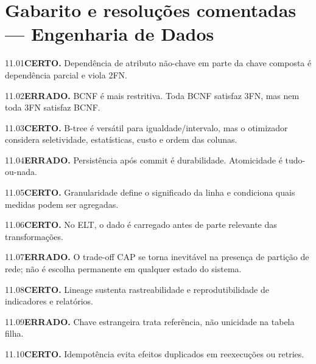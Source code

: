\section{Gabarito e resoluções comentadas — Engenharia de Dados}

\begin{solucao}{11.01}\textbf{CERTO.} Dependência de atributo não-chave em parte da chave composta é dependência parcial e viola 2FN.\end{solucao}
\begin{solucao}{11.02}\textbf{ERRADO.} BCNF é mais restritiva. Toda BCNF satisfaz 3FN, mas nem toda 3FN satisfaz BCNF.\end{solucao}
\begin{solucao}{11.03}\textbf{CERTO.} B-tree é versátil para igualdade/intervalo, mas o otimizador considera seletividade, estatísticas, custo e ordem das colunas.\end{solucao}
\begin{solucao}{11.04}\textbf{ERRADO.} Persistência após commit é durabilidade. Atomicidade é tudo-ou-nada.\end{solucao}
\begin{solucao}{11.05}\textbf{CERTO.} Granularidade define o significado da linha e condiciona quais medidas podem ser agregadas.\end{solucao}
\begin{solucao}{11.06}\textbf{CERTO.} No ELT, o dado é carregado antes de parte relevante das transformações.\end{solucao}
\begin{solucao}{11.07}\textbf{ERRADO.} O trade-off CAP se torna inevitável na presença de partição de rede; não é escolha permanente em qualquer estado do sistema.\end{solucao}
\begin{solucao}{11.08}\textbf{CERTO.} Lineage sustenta rastreabilidade e reprodutibilidade de indicadores e relatórios.\end{solucao}
\begin{solucao}{11.09}\textbf{ERRADO.} Chave estrangeira trata referência, não unicidade na tabela filha.\end{solucao}
\begin{solucao}{11.10}\textbf{CERTO.} Idempotência evita efeitos duplicados em reexecuções ou retries.\end{solucao}

